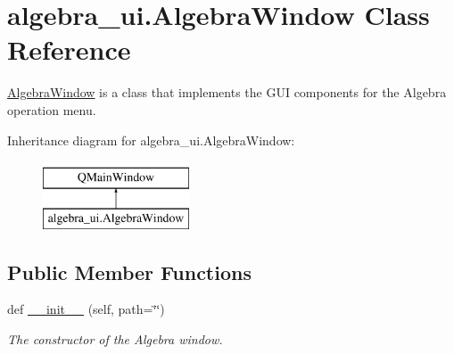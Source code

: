 \hypertarget{classalgebra__ui_1_1_algebra_window}{}\section{algebra\+\_\+ui.\+Algebra\+Window Class Reference}
\label{classalgebra__ui_1_1_algebra_window}


\hyperlink{classalgebra__ui_1_1_algebra_window}{Algebra\+Window} is a class that implements the G\+UI components for the Algebra operation menu.  


Inheritance diagram for algebra\+\_\+ui.\+Algebra\+Window\+:\begin{figure}[H]
\begin{center}
\leavevmode
\includegraphics[height=2.000000cm]{classalgebra__ui_1_1_algebra_window}
\end{center}
\end{figure}
\subsection*{Public Member Functions}
\begin{DoxyCompactItemize}
\item 
def \hyperlink{classalgebra__ui_1_1_algebra_window_a8a5c82431399cd2792b44fdcff991873}{\+\_\+\+\_\+init\+\_\+\+\_\+} (self, path=\char`\"{}\char`\"{})
\begin{DoxyCompactList}\small\item\em The constructor of the Algebra window. \end{DoxyCompactList}\end{DoxyCompactItemize}
